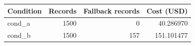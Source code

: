 \begin{tabular}{lrrr}
Condition & Records & Fallback records & Cost (USD)\\
\hline
cond_a & 1500 & 0 & 40.286970\\
cond_b & 1500 & 157 & 151.101477\\
\end{tabular}
